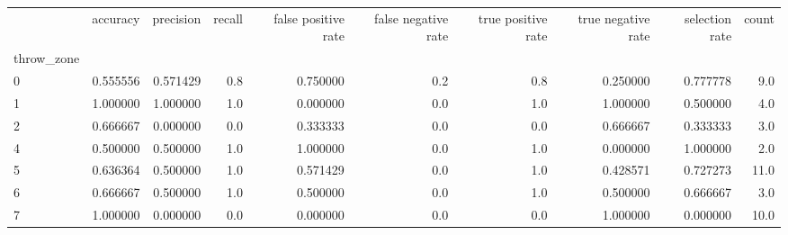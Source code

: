 \begin{tabular}{lrrrrrrrrr}
\toprule
{} &  accuracy &  precision &  recall &  false positive rate &  false negative rate &  true positive rate &  true negative rate &  selection rate &  count \\
throw\_zone &           &            &         &                      &                      &                     &                     &                 &        \\
\midrule
0          &  0.555556 &   0.571429 &     0.8 &             0.750000 &                  0.2 &                 0.8 &            0.250000 &        0.777778 &    9.0 \\
1          &  1.000000 &   1.000000 &     1.0 &             0.000000 &                  0.0 &                 1.0 &            1.000000 &        0.500000 &    4.0 \\
2          &  0.666667 &   0.000000 &     0.0 &             0.333333 &                  0.0 &                 0.0 &            0.666667 &        0.333333 &    3.0 \\
4          &  0.500000 &   0.500000 &     1.0 &             1.000000 &                  0.0 &                 1.0 &            0.000000 &        1.000000 &    2.0 \\
5          &  0.636364 &   0.500000 &     1.0 &             0.571429 &                  0.0 &                 1.0 &            0.428571 &        0.727273 &   11.0 \\
6          &  0.666667 &   0.500000 &     1.0 &             0.500000 &                  0.0 &                 1.0 &            0.500000 &        0.666667 &    3.0 \\
7          &  1.000000 &   0.000000 &     0.0 &             0.000000 &                  0.0 &                 0.0 &            1.000000 &        0.000000 &   10.0 \\
\bottomrule
\end{tabular}
